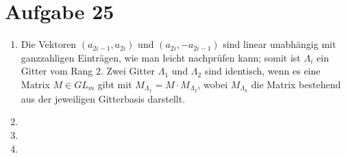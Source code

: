\section*{Aufgabe 25}
\begin{enumerate}[(1)]
	\item Die Vektoren $(a_{2 i - 1}, a_{2 i})$ und $(a_{2 i},-a_{2 i -
	1})$ sind linear unabhängig mit ganzzahligen Einträgen, wie man leicht
	nachprüfen kann; somit ist $\Lambda_i$ ein Gitter vom Rang $2$. Zwei
	Gitter $\Lambda_1$ und $\Lambda_2$ sind identisch, wenn es eine Matrix
	$M \in GL_m$ gibt mit $M_{\Lambda_1} = M \cdot M_{\Lambda_2}$, wobei
	$M_{\Lambda_k}$ die Matrix bestehend aus der jeweiligen Gitterbasis
	darstellt.
	\item 
	\item
	\item
\end{enumerate}
